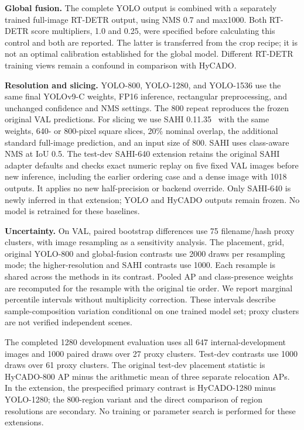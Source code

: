 \documentclass[journal]{IEEEtran}
\begin{document}
\textbf{Global fusion.} The complete YOLO output is combined with a separately trained full-image RT-DETR output, using NMS 0.7 and max1000. Both RT-DETR score multipliers, 1.0 and 0.25, were specified before calculating this control and both are reported. The latter is transferred from the crop recipe; it is not an optimal calibration established for the global model. Different RT-DETR training views remain a confound in comparison with HyCADO.

\textbf{Resolution and slicing.} YOLO-800, YOLO-1280, and YOLO-1536 use the same final YOLOv9-C weights, FP16 inference, rectangular preprocessing, and unchanged confidence and NMS settings. The 800 repeat reproduces the frozen original VAL predictions. For slicing we use SAHI 0.11.35~\cite{akyon2022sahi} with the same weights, 640- or 800-pixel square slices, 20\% nominal overlap, the additional standard full-image prediction, and an input size of 800. SAHI uses class-aware NMS at IoU 0.5. The test-dev SAHI-640 extension retains the original SAHI adapter defaults and checks exact numeric replay on five fixed VAL images before new inference, including the earlier ordering case and a dense image with 1018 outputs. It applies no new half-precision or backend override. Only SAHI-640 is newly inferred in that extension; YOLO and HyCADO outputs remain frozen. No model is retrained for these baselines.

\textbf{Uncertainty.} On VAL, paired bootstrap differences use 75 filename/hash proxy clusters, with image resampling as a sensitivity analysis. The placement, grid, original YOLO-800 and global-fusion contrasts use 2000 draws per resampling mode; the higher-resolution and SAHI contrasts use 1000. Each resample is shared across the methods in its contrast. Pooled AP and class-presence weights are recomputed for the resample with the original tie order. We report marginal percentile intervals without multiplicity correction. These intervals describe sample-composition variation conditional on one trained model set; proxy clusters are not verified independent scenes.

The completed 1280 development evaluation uses all 647 internal-development images and 1000 paired draws over 27 proxy clusters. Test-dev contrasts use 1000 draws over 61 proxy clusters. The original test-dev placement statistic is HyCADO-800 AP minus the arithmetic mean of three separate relocation APs. In the extension, the prespecified primary contrast is HyCADO-1280 minus YOLO-1280; the 800-region variant and the direct comparison of region resolutions are secondary. No training or parameter search is performed for these extensions.
\end{document}
